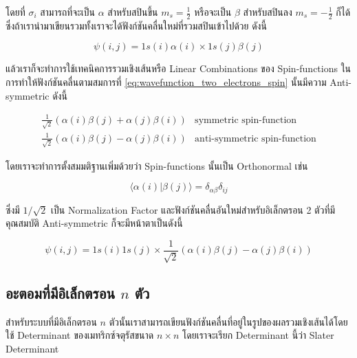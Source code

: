 \noindent โดยที่ $\sigma_i$ สามารถที่จะเป็น $\alpha$ สำหรับสปินขึ้น $m_s=\frac{1}{2}$ หรือจะเป็น $\beta$ สำหรับสปินลง
$m_s=-\frac{1}{2}$ ก็ได้ ซึ่งถ้าเรานำมาเขียนรวมทั้งเราจะได้ฟังก์ชันคลื่นใหม่ที่รวมสปินเข้าไปด้วย ดังนี้

\begin{equation}
    \label{eq:wavefunction_two_electrons_spin}
    \psi(i, j)
    =
    1 s(i) \alpha(i) \times 1 s(j) \beta(j)
\end{equation}

\noindent แล้วเราก็จะทำการใช้เทคนิคการรวมเชิงเส้นหรือ Linear Combinations ของ Spin-functions ในการทำให้ฟังก์ชันคลื่นตามสมการที่
\ref{eq:wavefunction_two_electrons_spin} นั้นมีความ Anti-symmetric ดังนี้

\begin{equation}
    \begin{array}{ll}
        \frac{1}{\sqrt{2}}(\alpha(i) \beta(j) + \alpha(j) \beta(i)) & \text{symmetric spin-function}      \\
        \frac{1}{\sqrt{2}}(\alpha(i) \beta(j) - \alpha(j) \beta(i)) & \text{anti-symmetric spin-function}
    \end{array}
\end{equation}

\noindent โดยเราจะทำการตั้งสมมติฐานเพิ่มด้วยว่า Spin-functions นั้นเป็น Orthonormal เช่น

\begin{equation}
    \label{eq:Spin_function_orthogonality}
    \langle\alpha(i) | \beta(j)\rangle=\delta_{\alpha \beta} \delta_{i j}
\end{equation}

\noindent ซึ่งมี $1 / \sqrt{2}$ เป็น Normalization Factor และฟังก์ชันคลื่นอันใหม่สำหรับอิเล็กตรอน 2 ตัวที่มีคุณสมบัติ Anti-symmetric
ก็จะมีหน้าตาเป็นดังนี้

\begin{equation}
    \psi(i, j)
    =
    1 s(i) 1 s(j) \times \frac{1}{\sqrt{2}}(\alpha(i) \beta(j)-\alpha(j) \beta(i))
\end{equation}

\subsection{อะตอมที่มีอิเล็กตรอน $n$ ตัว}

สำหรับระบบที่มีอิเล็กตรอน $n$ ตัวนั้นเราสามารถเขียนฟังก์ชันคลื่นที่อยู่ในรูปของผลรวมเชิงเส้นได้โดยใช้ Determinant ของเมทริกซ์จตุรัสขนาด
$n \times n$ โดยเราจะเรียก Determinant นี้ว่า Slater Determinant


